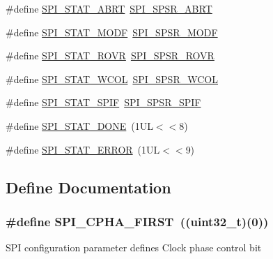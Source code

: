 \begin{DoxyCompactItemize}
\item 
\#define \hyperlink{group___s_p_i___public___macros_ga7fb828bf42ed32e88b587b78a12040bd}{\-S\-P\-I\-\_\-\-S\-T\-A\-T\-\_\-\-A\-B\-R\-T}~\hyperlink{group___s_p_i___private___macros_gaaf7712834ac27a14993051970e9efddf}{\-S\-P\-I\-\_\-\-S\-P\-S\-R\-\_\-\-A\-B\-R\-T}
\item 
\#define \hyperlink{group___s_p_i___public___macros_ga536d32411d5dcb91f35a32ea3d07ea5e}{\-S\-P\-I\-\_\-\-S\-T\-A\-T\-\_\-\-M\-O\-D\-F}~\hyperlink{group___s_p_i___private___macros_ga96d682cc12df75a8993c4bc5af6313a2}{\-S\-P\-I\-\_\-\-S\-P\-S\-R\-\_\-\-M\-O\-D\-F}
\item 
\#define \hyperlink{group___s_p_i___public___macros_ga020c10819d496aceb4f09d8a000a9691}{\-S\-P\-I\-\_\-\-S\-T\-A\-T\-\_\-\-R\-O\-V\-R}~\hyperlink{group___s_p_i___private___macros_gaf1751e5dd5a9ac89397a957d90f3e911}{\-S\-P\-I\-\_\-\-S\-P\-S\-R\-\_\-\-R\-O\-V\-R}
\item 
\#define \hyperlink{group___s_p_i___public___macros_ga90462f910bfc8a146d0de70c71f09631}{\-S\-P\-I\-\_\-\-S\-T\-A\-T\-\_\-\-W\-C\-O\-L}~\hyperlink{group___s_p_i___private___macros_ga46ba3f4e139f22860081b48f8d19c91e}{\-S\-P\-I\-\_\-\-S\-P\-S\-R\-\_\-\-W\-C\-O\-L}
\item 
\#define \hyperlink{group___s_p_i___public___macros_gaaed3beefd4f8b8f269a64663f9802658}{\-S\-P\-I\-\_\-\-S\-T\-A\-T\-\_\-\-S\-P\-I\-F}~\hyperlink{group___s_p_i___private___macros_gad42ab0064435d5362a0fb61cfde34780}{\-S\-P\-I\-\_\-\-S\-P\-S\-R\-\_\-\-S\-P\-I\-F}
\item 
\#define \hyperlink{group___s_p_i___public___macros_ga6e79dcd7d55f6a5c9fb017d65af9ee52}{\-S\-P\-I\-\_\-\-S\-T\-A\-T\-\_\-\-D\-O\-N\-E}~(1\-U\-L$<$$<$8)
\item 
\#define \hyperlink{group___s_p_i___public___macros_ga75515abf1b0f7e225d23d16031eebe72}{\-S\-P\-I\-\_\-\-S\-T\-A\-T\-\_\-\-E\-R\-R\-O\-R}~(1\-U\-L$<$$<$9)
\end{DoxyCompactItemize}


\subsection{\-Define \-Documentation}
\hypertarget{group___s_p_i___public___macros_gab7c5fc382a31cde4a337edc1f71da83b}{
\subsubsection[{\-S\-P\-I\-\_\-\-C\-P\-H\-A\-\_\-\-F\-I\-R\-S\-T}]{\setlength{\rightskip}{0pt plus 5cm}\#define {\bf \-S\-P\-I\-\_\-\-C\-P\-H\-A\-\_\-\-F\-I\-R\-S\-T}~((uint32\-\_\-t)(0))}}\label{group___s_p_i___public___macros_gab7c5fc382a31cde4a337edc1f71da83b}
\-S\-P\-I configuration parameter defines \-Clock phase control bit 

